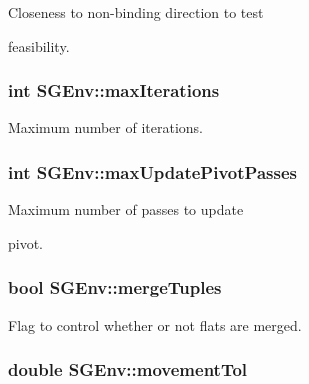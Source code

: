 \begin{DoxyVerb}       Closeness to non-binding direction to test
\end{DoxyVerb}
 feasibility. \hypertarget{classSGEnv_abc462c4d56ad63f56a4b3376acd59654}{
\subsubsection[{max\-Iterations}]{\setlength{\rightskip}{0pt plus 5cm}int S\-G\-Env\-::max\-Iterations\hspace{0.3cm}{\ttfamily [private]}}}\label{classSGEnv_abc462c4d56ad63f56a4b3376acd59654}
Maximum number of iterations. \hypertarget{classSGEnv_a4c41c1b8036d4cd3e70cea3016d422cd}{
\subsubsection[{max\-Update\-Pivot\-Passes}]{\setlength{\rightskip}{0pt plus 5cm}int S\-G\-Env\-::max\-Update\-Pivot\-Passes\hspace{0.3cm}{\ttfamily [private]}}}\label{classSGEnv_a4c41c1b8036d4cd3e70cea3016d422cd}
\begin{DoxyVerb}           Maximum number of passes to update
\end{DoxyVerb}
 pivot. \hypertarget{classSGEnv_af76edb443f16969deeaa0b308269a221}{
\subsubsection[{merge\-Tuples}]{\setlength{\rightskip}{0pt plus 5cm}bool S\-G\-Env\-::merge\-Tuples\hspace{0.3cm}{\ttfamily [private]}}}\label{classSGEnv_af76edb443f16969deeaa0b308269a221}
Flag to control whether or not flats are merged. \hypertarget{classSGEnv_a6354c8a9cde7ae64f8e087ab489956af}{
\subsubsection[{movement\-Tol}]{\setlength{\rightskip}{0pt plus 5cm}double S\-G\-Env\-::movement\-Tol\hspace{0.3cm}{\ttfamily [private]}}}\label{classSGEnv_a6354c8a9cde7ae64f8e087ab489956af}
